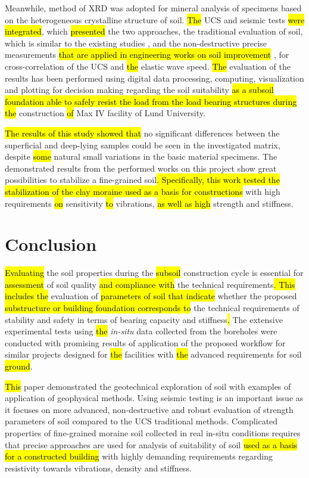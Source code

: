 \documentclass[USenglish,twocolumn]{article}
\begin{document}
Meanwhile, method of XRD was adopted for mineral analysis of specimens based on the heterogeneous crystalline structure of soil. \hl{ The} UCS and seismic tests \hl{were integrated}, which \hl{presented} the two approaches, the traditional evaluation of soil, which is similar to the existing studies \cite{Yilmaz}, and the non-destructive precise measurements \hl{that are applied in engineering works on soil improvement} \cite{Staab,Madhyannapu}, for cross-correlation of the UCS and \hl{the }elastic wave speed. \hl{The }evaluation of the results has been performed using digital data processing, computing, visualization and plotting for decision making regarding the soil suitability \hl{as a subsoil foundation able to safely resist the load from the load bearing structures during the }construction \hl{of }Max IV facility of Lund University. 

\hl{The results of this study showed that }no significant differences between the superficial and deep-lying samples could be seen in the investigated matrix, despite \hl{some }natural small variations in the basic material specimens. The demonstrated results from the performed works on this project show great possibilities to stabilize a fine-grained soil\hl{. Specifically, this work tested the stabilization of the clay moraine used as a basis for constructions } with high requirements \hl{on} sensitivity \hl{to} vibrations, \hl{as well as high} strength and stiffness.

\section{Conclusion}\label{sec:7}

\hl{Evaluating} the soil properties during the \hl{subsoil} construction cycle is essential for \hl{assessment} of\hl{ }soil quality \hl{and compliance with }the technical requirements\hl{. This includes the }evaluation of \hl{parameters of soil that indicate }whether the proposed \hl{substructure or building foundation corresponds to} the technical requirements of stability and safety in terms of bearing capacity and stiffness\hl{. }The extensive experimental tests using \hl{the }\emph{in-situ} data collected from the boreholes were conducted with promising results of application of the proposed workflow for similar projects designed for \hl{the }facilities with \hl{the }advanced requirements for soil \hl{ground}. 

\hl{This} paper\hl{ }demonstrated the geotechnical exploration of soil with examples of application of geophysical methods. Using seismic testing is an important issue as it focuses on more advanced, non-destructive and robust evaluation of strength parameters of soil compared to the UCS traditional methods. Complicated properties of fine-grained moraine soil collected in real in-situ conditions requires that precise approaches are used for analysis of suitability of soil \hl{used as a basis for a constructed building} with highly demanding requirements regarding resistivity towards vibrations, density and stiffness.
\end{document}
